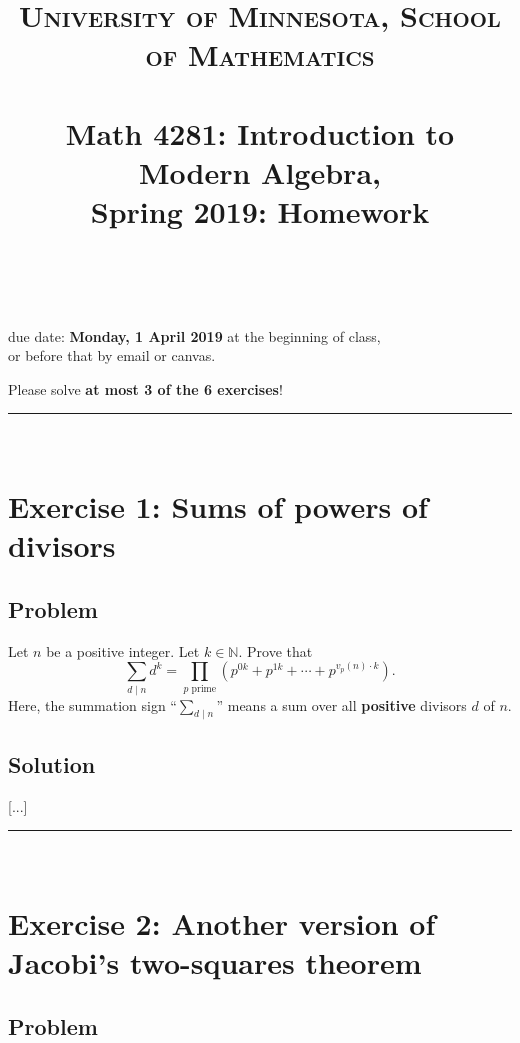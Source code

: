 \documentclass[paper=a4, fontsize=12pt]{scrartcl} %
\title{	
\normalfont \normalsize 
\textsc{University of Minnesota, School of Mathematics} \\ [25pt] %
\horrule{0.5pt} \\[0.4cm] %
\huge Math 4281: Introduction to Modern Algebra, \\
Spring 2019:
Homework \psetnumber\\%
\horrule{2pt} \\[0.5cm] %
}
\author{\myname}
\newcommand{\NN}{\mathbb{N}} %
\newcommand{\tup}[1]{\left( #1 \right)}
\newcommand{\horrule}[1]{\rule{\linewidth}{#1}} %
\let\sumnonlimits\sum
\let\prodnonlimits\prod
\renewcommand{\sum}{\sumnonlimits\limits}
\renewcommand{\prod}{\prodnonlimits\limits}
\theoremstyle{plainsl}
\theoremstyle{definition}
\theoremstyle{remark}
\begin{document}
\maketitle %

\begin{center} %
{\large due date: \textbf{Monday, 1 April 2019} at the beginning of class, \\
or before that by email or canvas.

Please solve \textbf{at most 3 of the 6 exercises}!}
\end{center}

\horrule{0.3pt} \\[0.4cm]

\section{Exercise 1: Sums of powers of divisors}

\subsection{Problem}

Let $n$ be a positive integer. Let $k \in \NN$.
Prove that
\[
\sum_{d \mid n} d^k
= \prod_{p \text{ prime}} \tup{p^{0k} + p^{1k} + \cdots + p^{v_p\tup{n}\cdot k} }.
\]
Here, the summation sign ``$\sum_{d \mid n}$'' means a sum over
all \textbf{positive} divisors $d$ of $n$.

\subsection{Solution}

[...]

\horrule{0.3pt} \\[0.4cm]

\section{Exercise 2: Another version of Jacobi's two-squares theorem}

\subsection{Problem}
\end{document}
